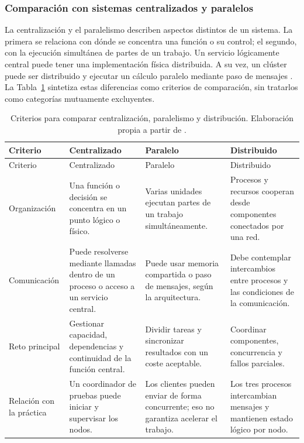 \subsubsection{Comparación con sistemas centralizados y paralelos}

La centralización y el paralelismo describen aspectos distintos de un sistema.
La primera se relaciona con dónde se concentra una función o su control; el segundo,
con la ejecución simultánea de partes de un trabajo. Un servicio lógicamente central
puede tener una implementación física distribuida. A su vez, un clúster puede ser
distribuido y ejecutar un cálculo paralelo mediante paso de mensajes
\cite[pp.~6--7, 33--34]{belinda_vansteen2023_distributed}.
La Tabla~\ref{tab:comparacion-sistemas} sintetiza estas diferencias como criterios
de comparación, sin tratarlos como categorías mutuamente excluyentes.

\begingroup
\small
\renewcommand{\arraystretch}{1.2}
\begin{longtable}{@{}>{\raggedright\arraybackslash}p{2.7cm}>{\raggedright\arraybackslash}p{3.8cm}>{\raggedright\arraybackslash}p{3.8cm}>{\raggedright\arraybackslash}p{4.0cm}@{}}
\caption{Criterios para comparar centralización, paralelismo y distribución. Elaboración propia a partir de \cite[pp.~6--7, 33--34]{belinda_vansteen2023_distributed}.}
\label{tab:comparacion-sistemas}\\
\toprule
Criterio & Centralizado & Paralelo & Distribuido \\
\midrule
\endfirsthead
\toprule
Criterio & Centralizado & Paralelo & Distribuido \\
\midrule
\endhead
Organización & Una función o decisión se concentra en un punto lógico o físico.
& Varias unidades ejecutan partes de un trabajo simultáneamente.
& Procesos y recursos cooperan desde componentes conectados por una red. \\
Comunicación & Puede resolverse mediante llamadas dentro de un proceso o acceso a un servicio central.
& Puede usar memoria compartida o paso de mensajes, según la arquitectura.
& Debe contemplar intercambios entre procesos y las condiciones de la comunicación. \\
Reto principal & Gestionar capacidad, dependencias y continuidad de la función central.
& Dividir tareas y sincronizar resultados con un coste aceptable.
& Coordinar componentes, concurrencia y fallos parciales. \\
Relación con la práctica & Un coordinador de pruebas puede iniciar y supervisar los nodos.
& Los clientes pueden enviar de forma concurrente; eso no garantiza acelerar el trabajo.
& Los tres procesos intercambian mensajes y mantienen estado lógico por nodo. \\
\bottomrule
\end{longtable}
\endgroup


